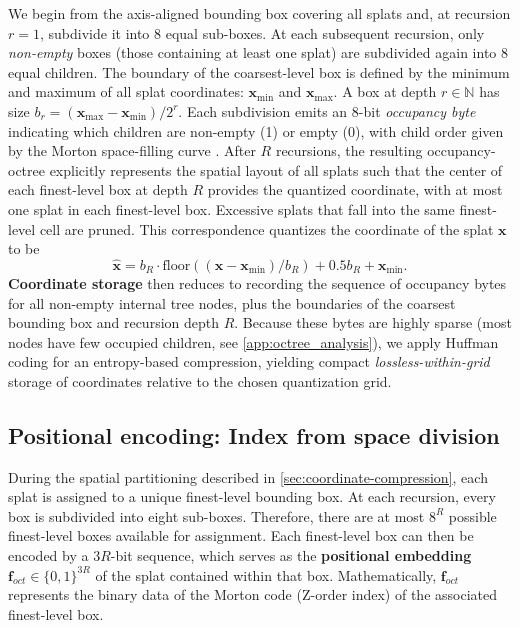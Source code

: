 \documentclass{article}
\def\vf{{\bm{f}}}
\def\vx{{\bm{x}}}
\begin{document}
%
We begin from the axis-aligned bounding box covering all splats and, at recursion $r=1$, subdivide it into 8 equal sub-boxes. At each subsequent recursion, only \emph{non-empty} boxes (those containing at least one splat) are subdivided again into $8$ equal children. The boundary of the coarsest-level box is defined by the minimum and maximum of all splat coordinates: $\vx_{\min}$ and $\vx_{\max}$. A box at depth $r\in\mathbb{N}$ has size $b_r = (\vx_{\max}-\vx_{\min})/2^{r}$. Each subdivision emits an 8-bit \emph{occupancy byte} indicating which children are non-empty (1) or empty (0), with child order given by the Morton space-filling curve \cite{morton1966spacefilling}. After $R$ recursions, the resulting occupancy-octree explicitly represents the spatial layout of all splats such that the center of each finest-level box at depth $R$ provides the quantized coordinate, with at most one splat in each finest-level box. Excessive splats that fall into the same finest-level cell are pruned. This correspondence quantizes the coordinate of the splat $\vx$ to be 
\begin{equation}
  \label{eq:quantized_coor}
  \hat{\vx} = b_R \cdot \mathrm{floor}((\vx - \vx_{\min}) /b_R) + 0.5 b_R + \vx_{\min}.
\end{equation}
%
%
%
\textbf{Coordinate storage} then reduces to recording the sequence of occupancy bytes for all non-empty internal tree nodes, plus the boundaries of the coarsest bounding box  and recursion depth $R$. Because these bytes are highly sparse (most nodes have few occupied children, see \cref{app:octree_analysis}), we apply Huffman coding \cite{huffman2007method} for an entropy-based compression, yielding compact \emph{lossless-within-grid} storage of coordinates relative to the chosen quantization grid.





\subsection{Positional encoding: Index from space division}
\label{sec:pos_encoding}
During the spatial partitioning described in \cref{sec:coordinate-compression}, each splat is assigned to a unique finest-level bounding box. At each recursion, every box is subdivided into eight sub-boxes. Therefore, there are at most $8^{R}$ possible finest-level boxes available for assignment.
Each finest-level box can then be encoded by a $3R$-bit sequence, which serves as the \textbf{positional embedding} $\vf_{oct} \in \{0,1\}^{3R}$ of the splat contained within that box. Mathematically, $\vf_{oct}$ represents the binary data of the Morton code (Z-order index) \citep{morton1966spacefilling} of the associated finest-level box.
\end{document}
